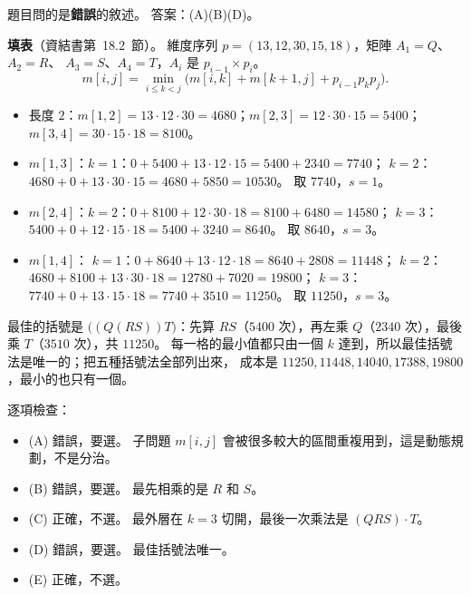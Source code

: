 \begin{pastsoln}
題目問的是\textbf{錯誤}的敘述。 答案：(A)(B)(D)。

\textbf{填表}（資結書第~18.2~節）。 維度序列 $p = (13, 12, 30, 15, 18)$，矩陣 $A_1 = Q$、$A_2 = R$、
$A_3 = S$、$A_4 = T$，$A_i$ 是 $p_{i-1} \times p_i$。
\[
m[i, j] = \min_{i \le k < j}\bigl(m[i, k] + m[k+1, j] + p_{i-1}p_k p_j\bigr).
\]
\begin{itemize}
\item 長度 $2$：$m[1,2] = 13 \cdot 12 \cdot 30 = 4680$；$m[2,3] = 12 \cdot 30 \cdot 15 = 5400$；
$m[3,4] = 30 \cdot 15 \cdot 18 = 8100$。
\item $m[1,3]$：$k = 1$：$0 + 5400 + 13 \cdot 12 \cdot 15 = 5400 + 2340 = 7740$；
$k = 2$：$4680 + 0 + 13 \cdot 30 \cdot 15 = 4680 + 5850 = 10530$。 取 $7740$，$s = 1$。
\item $m[2,4]$：$k = 2$：$0 + 8100 + 12 \cdot 30 \cdot 18 = 8100 + 6480 = 14580$；
$k = 3$：$5400 + 0 + 12 \cdot 15 \cdot 18 = 5400 + 3240 = 8640$。 取 $8640$，$s = 3$。
\item $m[1,4]$：
$k = 1$：$0 + 8640 + 13 \cdot 12 \cdot 18 = 8640 + 2808 = 11448$；
$k = 2$：$4680 + 8100 + 13 \cdot 30 \cdot 18 = 12780 + 7020 = 19800$；
$k = 3$：$7740 + 0 + 13 \cdot 15 \cdot 18 = 7740 + 3510 = 11250$。 取 $11250$，$s = 3$。
\end{itemize}
最佳的括號是 $\bigl((Q(RS))T\bigr)$：先算 $RS$（$5400$ 次），再左乘 $Q$（$2340$ 次），最後乘 $T$（$3510$
次），共 $11250$。 每一格的最小值都只由一個 $k$ 達到，所以最佳括號法是唯一的；把五種括號法全部列出來，
成本是 $11250, 11448, 14040, 17388, 19800$，最小的也只有一個。

逐項檢查：
\begin{itemize}
\item (A) 錯誤，要選。 子問題 $m[i, j]$ 會被很多較大的區間重複用到，這是動態規劃，不是分治。
\item (B) 錯誤，要選。 最先相乘的是 $R$ 和 $S$。
\item (C) 正確，不選。 最外層在 $k = 3$ 切開，最後一次乘法是 $(QRS) \cdot T$。
\item (D) 錯誤，要選。 最佳括號法唯一。
\item (E) 正確，不選。
\end{itemize}
\end{pastsoln}
